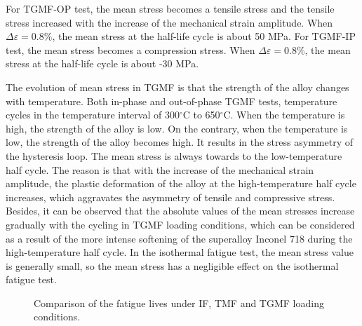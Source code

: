 \documentclass[preprint,5p,twocolumn,11pt,sort&compress]{elsarticle}
\begin{document}
For TGMF-OP test, the mean stress becomes a tensile stress and the tensile stress increased with the increase of the mechanical strain amplitude.
When $\Delta \varepsilon=0.8\%$, the mean stress at the half-life cycle is about 50 MPa. For TGMF-IP test, the mean stress becomes a compression stress. When $\Delta \varepsilon=0.8\%$, the mean stress at the half-life cycle is about -30 MPa.

The evolution of mean stress in TGMF is that the strength of the alloy changes with temperature. Both in-phase and out-of-phase TGMF tests, temperature cycles in the temperature interval of 300$^\circ$C to 650$^\circ$C. When the temperature is high, the strength of the alloy is low. On the contrary, when the temperature is low, the strength of the alloy becomes high. It results in the stress asymmetry of the hysteresis loop. The mean stress is always towards to the low-temperature half cycle.
The reason is that with the increase of the mechanical strain amplitude, the plastic deformation of the alloy at the high-temperature half cycle increases, which aggravates the asymmetry of tensile and compressive stress.
Besides, it can be observed that the absolute values of the mean stresses increase gradually with the cycling in TGMF loading conditions, which can be considered as a result of the more intense softening of the superalloy Inconel 718 during the high-temperature half cycle. In the isothermal fatigue test, the mean stress value is generally small, so the mean stress has a negligible effect on the isothermal fatigue test.

\begin{figure}[!htp]
\caption{Comparison of the fatigue lives under IF, TMF and TGMF loading conditions.}
\label{Fig:plot_exp_fatigue_life_TGMF}
\end{figure}
\end{document}
